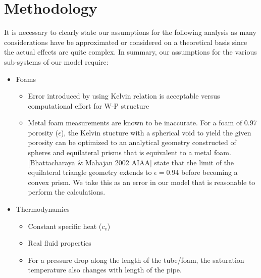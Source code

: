 \documentclass[asme2ejs.tex]{subfiles}
\begin{document}
\section{Methodology}

It is necessary to clearly state our assumptions for the following analysis as many considerations have be approximated or considered on a theoretical basis since the actual effects are quite complex. 
In summary, our assumptions for the various sub-systems of our model require:
\begin{itemize} %
	\item Foams
		\begin{itemize}
			\item 	Error introduced by using Kelvin relation is acceptable versus computational effort for W-P structure
			\item	Metal foam measurements are known to be inaccurate. 
			For a foam of 0.97 porosity ($\epsilon$), the Kelvin stucture with a spherical void to yield the given porosity can be optimized to an analytical geometry constructed of spheres and equilateral prisms that is equivalent to a metal foam. 
			[Bhattacharaya 		\& Mahajan 2002 AIAA] state that the limit of the equilateral triangle geometry extends to $\epsilon = 0.94$ before becoming a convex prism. 
			We take this as an error in our model that is reasonable to perform the calculations.
		\end{itemize}

	\item Thermodynamics
		\begin{itemize}
			\item	Constant specific heat ($c_v$)
			\item 	Real fluid properties
			\item 	For a pressure drop along the length of the tube/foam, the saturation temperature also changes with length of the pipe.
		\end{itemize}


\end{itemize}
\end{document}

